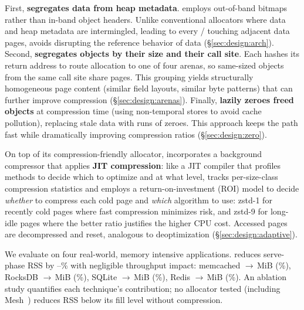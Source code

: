 First, \sys \textbf{segregates data from heap metadata}. \sys employs
  out-of-band bitmaps rather than in-band object headers.
  Unlike conventional allocators where data and heap metadata are intermingled,
  leading to every
  / touching adjacent data pages,
  \sys{} avoids disrupting the reference behavior of data
  (\S\ref{sec:design:arch}).
  Second, \sys \textbf{segregates objects by their size and their call site}.
  Each 
  hashes its return address to route allocation to one of four
  arenas, so same-sized objects from the same call site share pages. This grouping
  yields structurally homogeneous page content (similar field
  layouts, similar byte patterns) that can further improve compression
  (\S\ref{sec:design:arenas}).
  Finally, \sys \textbf{lazily zeroes freed objects} at compression time (using non-temporal stores to avoid cache pollution), replacing stale data with runs of zeroes. This approach keeps the  path fast while dramatically improving compression ratios
  (\S\ref{sec:design:zero}).

  
On top of its compression-friendly allocator, \sys incorporates a background
compressor that applies \textbf{JIT compression}: like a JIT compiler
that profiles methods to decide which to optimize and at what level,
\sys tracks per-size-class compression statistics and employs a
return-on-investment (ROI) model to decide \emph{whether} to compress
each cold page and \emph{which} algorithm to use: zstd-1 for
recently cold pages where fast compression minimizes risk, and
zstd-9 for long-idle pages where the better ratio justifies the
higher CPU cost.  Accessed pages are decompressed and reset,
analogous to deoptimization (\S\ref{sec:design:adaptive}).

We evaluate \sys on four real-world, memory intensive applications.  \sys reduces serve-phase
RSS by \rssRedMin--\rssRedMax\% with negligible throughput impact:
memcached \ablMemcachedBaselineServeRss$\to$\ablMemcachedDefaultServeRss\,MiB
(\ablMemcachedDefaultRssRedInt\%),
RocksDB \ablRocksdbBaselineServeRss$\to$\ablRocksdbDefaultServeRss\,MiB
(\ablRocksdbDefaultRssRedInt\%),
SQLite \ablSqliteBaselineServeRss$\to$\ablSqliteDefaultServeRss\,MiB
(\ablSqliteDefaultRssRedInt\%),
Redis \ablRedisBaselineServeRss$\to$\ablRedisDefaultServeRss\,MiB
(\ablRedisDefaultRssRedInt\%).
An ablation study quantifies each technique's contribution;
no allocator tested (including
Mesh~\cite{powers2019mesh}) reduces RSS below its fill level
without compression.

